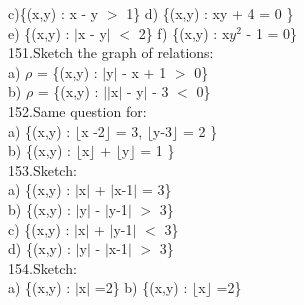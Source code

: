 \documentclass[11pt]{amsbook}
\begin{document}
\hspace{1 cm} c)\{(x,y) : x - y $>$ 1\} \hspace{1,6 cm} d) \{(x,y) : xy + 4 = 0 \} \\

\hspace{1 cm} e) \{(x,y) : $\rvert$x - y$\rvert$ $<$ 2\} \hspace{1.2 cm} f) \{(x,y) : x$y^{2}$ - 1 = 0\} \\

151.Sketch the graph of relations: \\

\hspace{1 cm} a) $\rho$ = \{(x,y) : $\rvert$y$\rvert$ - x + 1 $>$ 0\} \\

\hspace{1 cm} b) $\rho$ = \{(x,y) : $\rvert$$\rvert$x$\rvert$ - y$\rvert$ - 3 $<$ 0\} \\

152.Same question for: \\

 \hspace{1 cm} a) \{(x,y) : $\lfloor$x -2$\rfloor$ = 3, $\lfloor$y-3$\rfloor$ = 2 \}   \\ 
 
 \hspace{1 cm} b) \{(x,y) : $\lfloor$x$\rfloor$ + $\lfloor$y$\rfloor$ = 1 \}   \\ 
 
153.Sketch: \\

\hspace{1 cm} a) \{(x,y) : $\rvert$x$\rvert$  + $\rvert$x-1$\rvert$ = 3\} \\

\hspace{1 cm} b) \{(x,y) : $\rvert$y$\rvert$ - $\rvert$y-1$\rvert$ $>$ 3\} \\

\hspace{1 cm} c) \{(x,y) : $\rvert$x$\rvert$ + $\rvert$y-1$\rvert$ $<$ 3\} \\

\hspace{1 cm} d) \{(x,y) : $\rvert$y$\rvert$ - $\rvert$x-1$\rvert$ $>$ 3\} \\

154.Sketch: \\

\hspace{1 cm} a) \{(x,y) :  $\rvert$x$\rvert$ =2\} \hspace{1 cm} b) \{(x,y) :  $\lfloor$x$\rfloor$ =2\} \\
\end{document}
